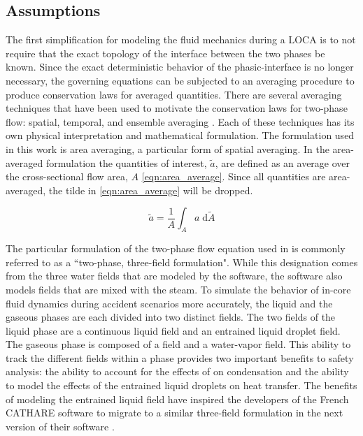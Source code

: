 \subsection{Assumptions}
\label{subsect:assumptions}

The first simplification for modeling the fluid mechanics during a LOCA is to not require that the exact topology of the interface between the two phases be known.
Since the exact deterministic behavior of the phasic-interface is no longer necessary, the governing equations can be subjected to an averaging procedure to produce conservation laws for averaged quantities.
There are several averaging techniques that have been used to motivate the conservation laws for two-phase flow: spatial, temporal, and ensemble averaging \cite{Drew1998, Todreas2011}.
Each of these techniques has its own physical interpretation and mathematical formulation.
The formulation used in this work is area averaging, a particular form of spatial averaging.
In the area-averaged formulation the quantities of interest, $\tilde{a}$, are defined as an average over the cross-sectional flow area, $A$ \eqref{eqn:area_average}.
Since all quantities are area-averaged, the tilde in \eqref{eqn:area_average} will be dropped.

\begin{equation}
\label{eqn:area_average}
\tilde{a} = \frac{1}{A}\int_{A} a \;\mathrm{d}\tilde{A}
\end{equation}

The particular formulation of the two-phase flow equation used in \cobra{} is commonly referred to as a ``two-phase, three-field formulation".
While this designation comes from the three water fields that are modeled by the software, the software also models \ncg{} fields that are mixed with the steam.
To simulate the behavior of in-core fluid dynamics during accident scenarios more accurately, the liquid and the gaseous phases are each divided into two distinct fields.
The two fields of the liquid phase are a continuous liquid field and an entrained liquid droplet field.
The gaseous phase is composed of a \ncg{} field and a water-vapor field. 
This ability to track the different fields within a phase provides two important benefits to safety analysis: the ability to account for the effects of \ncgs{} on condensation and the ability to model the effects of the entrained liquid droplets on heat transfer.
The benefits of modeling the entrained liquid field have inspired the developers of the French CATHARE software to migrate to a similar three-field formulation in the next version of their software \cite{Emonot2011}.

